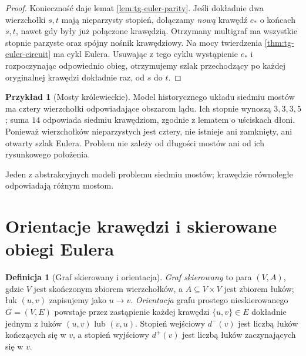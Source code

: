 \documentclass[11pt,a4paper]{report}
\numberwithin{equation}{section}
\theoremstyle{plain}
\theoremstyle{definition}
\newtheorem{definicja}[twierdzenie]{Definicja}
\newtheorem{przyklad}[twierdzenie]{Przykład}
\theoremstyle{remark}
\begin{document}
\begin{proof}
Konieczność daje lemat \ref{lem:tg-euler-parity}.
Jeśli dokładnie dwa wierzchołki $s,t$ mają nieparzysty
stopień, dołączamy \emph{nową} krawędź $e_*$ o końcach $s,t$,
nawet gdy były już połączone krawędzią. Otrzymany multigraf
ma wszystkie stopnie parzyste oraz spójny nośnik krawędziowy.
Na mocy twierdzenia \ref{thm:tg-euler-circuit} ma cykl Eulera.
Usuwając z tego cyklu wystąpienie $e_*$ i rozpoczynając
odpowiednio obieg, otrzymujemy szlak przechodzący po każdej
oryginalnej krawędzi dokładnie raz, od $s$ do $t$.
\end{proof}

\begin{przyklad}[Mosty królewieckie]
Model historycznego układu siedmiu mostów ma cztery
wierzchołki odpowiadające obszarom lądu. Ich stopnie
wynoszą $3,3,3,5$; suma $14$ odpowiada siedmiu krawędziom,
zgodnie z lematem o uściskach dłoni. Ponieważ wierzchołków
nieparzystych jest cztery, nie istnieje ani zamknięty,
ani otwarty szlak Eulera. Problem nie zależy od długości
mostów ani od ich rysunkowego położenia.
\end{przyklad}

\begin{center}

{\footnotesize Jeden z abstrakcyjnych modeli problemu siedmiu mostów;
krawędzie równoległe odpowiadają różnym mostom.}
\end{center}

\section{Orientacje krawędzi i skierowane obiegi Eulera}
\label{sec:tg-orientacje}

\begin{definicja}[Graf skierowany i orientacja]
\emph{Graf skierowany} to para $(V,A)$, gdzie $V$ jest
skończonym zbiorem wierzchołków, a $A\subseteq V\times V$
jest zbiorem łuków; łuk $(u,v)$ zapisujemy jako $u\to v$.
\emph{Orientacja} grafu prostego nieskierowanego $G=(V,E)$
powstaje przez zastąpienie każdej krawędzi $\{u,v\}\in E$
dokładnie jednym z łuków $(u,v)$ lub $(v,u)$.
Stopień wejściowy $d^-(v)$ jest liczbą łuków kończących się
w $v$, a stopień wyjściowy $d^+(v)$ jest liczbą łuków
zaczynających się w $v$.
\end{definicja}
\end{document}
